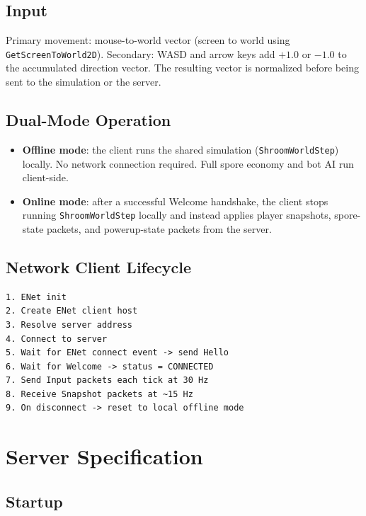 \documentclass[11pt]{article}
\begin{document}
\subsection{Input}

Primary movement: mouse-to-world vector (screen to world using \texttt{GetScreenToWorld2D}). Secondary: WASD and arrow keys add $+1.0$ or $-1.0$ to the accumulated direction vector. The resulting vector is normalized before being sent to the simulation or the server.

\subsection{Dual-Mode Operation}

\begin{itemize}
  \item \textbf{Offline mode}: the client runs the shared simulation (\texttt{ShroomWorldStep}) locally. No network connection required. Full spore economy and bot AI run client-side.
  \item \textbf{Online mode}: after a successful Welcome handshake, the client stops running \texttt{ShroomWorldStep} locally and instead applies player snapshots, spore-state packets, and powerup-state packets from the server.
\end{itemize}

\subsection{Network Client Lifecycle}

\begin{verbatim}
1. ENet init
2. Create ENet client host
3. Resolve server address
4. Connect to server
5. Wait for ENet connect event -> send Hello
6. Wait for Welcome -> status = CONNECTED
7. Send Input packets each tick at 30 Hz
8. Receive Snapshot packets at ~15 Hz
9. On disconnect -> reset to local offline mode
\end{verbatim}

\section{Server Specification}

\subsection{Startup}
\end{document}
